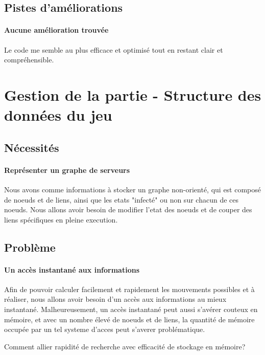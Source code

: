\documentclass{scratcl}
\begin{document}
    \subsection{Pistes d'améliorations}

    \paragraph{Aucune amélioration trouvée}
    Le code me semble au plus efficace et optimisé tout en restant clair et
    compréhensible.



    \section{Gestion de la partie - Structure des données du jeu}

    \subsection{Nécessités}

    \paragraph{Représenter un graphe de serveurs}
    Nous avons comme informations à stocker un graphe non-orienté, qui est
    composé de noeuds et de liens, ainsi que les etats "infecté" ou non sur
    chacun de ces noeuds.
    Nous allons avoir besoin de modifier l'etat des noeuds et de couper des
    liens spécifiques en pleine execution.

    \subsection{Problème}

    \paragraph{Un accès instantané aux informations}
    Afin de pouvoir calculer facilement et rapidement les mouvements
    possibles et à réaliser, nous allons avoir besoin d'un accès aux
    informations au mieux instantané.
    Malheureusement, un accès instantané peut aussi s'avérer couteux en
    mémoire, et avec un nombre élevé de noeuds et de liens, la quantité de
    mémoire occupée par un tel systeme d'acces peut s'averer problématique.

    Comment allier rapidité de recherche avec efficacité de stockage en mémoire?
\end{document}
